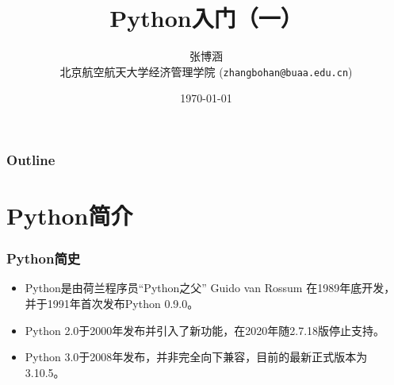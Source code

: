 \documentclass[10pt]{beamer}
\title{Python入门（一）}
\author{张博涵\\
北京航空航天大学经济管理学院 (\texttt{zhangbohan@buaa.edu.cn})}
\date{\today}
\begin{document}
\begin{frame}[plain]
\maketitle
\end{frame}


\begin{frame}
    \frametitle{Outline}
    \tableofcontents
\end{frame}

\section{Python简介}

\begin{frame}
\frametitle{Python简史}

\begin{figure}
    \hspace*{2cm}
\end{figure}

\begin{itemize}
    \item Python是由荷兰程序员``Python之父'' Guido van Rossum 在1989年底开发，并于1991年首次发布Python 0.9.0。
    \item Python 2.0于2000年发布并引入了新功能，在2020年随2.7.18版停止支持。
    \item Python 3.0于2008年发布，并非完全向下兼容，目前的最新正式版本为3.10.5。
\end{itemize}

\end{frame}
\end{document}
